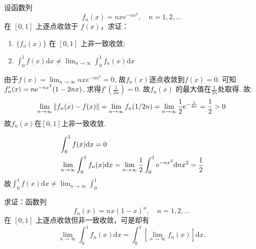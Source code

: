 \begin{problem}
    设函数列\[
        f_n(x) = nx e^{-nx^2} , \quad n = 1, 2, \dots
    \]
    在 \([0, 1]\) 上逐点收敛于 \(f(x)\)，求证：
    \begin{enumerate}
        \item \(\{f_n(x)\}\) 在 \([0, 1]\) 上非一致收敛;
        \item \(\int_{0}^{1} f(x) \mathrm{d}x \neq \lim_{n \to \infty}
            \int_{0}^{1} f_n(x) \mathrm{d}x\)
    \end{enumerate}
\end{problem}

\begin{solution}
    由于\(f(x) = \lim_{n \to \infty} nx e^{-nx^2} = 0\),
    故\(f_{n}(x)\)逐点收敛到\(f(x) = 0\).
    可知\(f_{n}'(x) = n \mathrm{e}^{-nx^{2}}(1-2nx)\), 求得\(f'\left(
    \frac{1}{2n} \right) = 0\). 故\(f_{n}(x)\)
    的最大值在\(\frac{1}{2n}\)处取得.
    故:
    \[
        \lim_{n \to \infty} \left\lVert f_{n}(x) - f(x) \right\rVert
        = \lim_{n \to \infty} f_{n}(1/2n) = \lim_{n \to \infty}
        \frac{1}{2} \mathrm{e}^{-\frac{1}{4n}} = \frac{1}{2} >  0
    \]
    故\(f_{n}(x)\)在\([0,1]\)上非一致收敛.

    \begin{align*}
        & \int_{0}^{1} f(x) \mathrm{d}x = 0                       \\
        & \lim_{n \to \infty} \int_{0}^{1} f_{n}(x) \mathrm{d}x =
        \lim_{n \to \infty} \frac{1}{2}\int_{0}^{1}
        \mathrm{e}^{-nx^{2}} \mathrm{d}nx^{2} = \frac{1}{2}
    \end{align*}
    故\(\int_{0}^{1} f(x) \mathrm{d}x \neq \lim_{n \to
    \infty} \int_{0}^{1}\)

\end{solution}

\begin{problem}
    求证：函数列
    \[
        f_n(x) = nx(1-x)^n, \quad n = 1, 2, \dots
    \]
    在 \([0, 1]\) 上逐点收敛但非一致收敛，可是却有
    \[
        \lim_{n \to \infty} \int_0^1 f_n(x) \mathrm{d}x =
        \int_0^1 \left[
        \lim_{n \to \infty} f_n(x) \right] \mathrm{d}x.
    \]
\end{problem}

